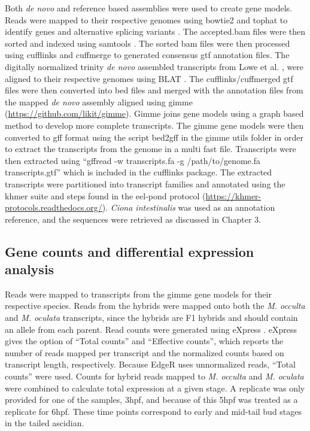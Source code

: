 Both \textit{de novo} and reference based assemblies were used to create gene models. Reads were mapped to their respective genomes using bowtie2 and tophat to identify genes and alternative splicing variants \cite{langmead_fast_2012,trapnell_differential_2012}. The accepted.bam files were then sorted and indexed using samtools \cite{li_sequence_2009}. The sorted bam files were then processed using cufflinks and cuffmerge to generated consensus gtf annotation files. The digitally normalized trinity \textit{de novo} assembled transcripts from Lowe et al. \cite{lowe_evaluating_2014}, were aligned to their respective genomes using BLAT \cite{haas_novo_2013}. The cufflinks/cuffmerged gtf files were then converted into bed files and merged with the annotation files from the mapped \textit{de novo} assembly aligned using gimme (\url{https://github.com/likit/gimme}). Gimme joins gene models using a graph based method to develop more complete transcripts. The gimme gene models were then converted to gff format using the script bed2gff in the gimme utils folder in order to extract the transcripts from the genome in a multi fast file. Transcripts were then extracted using ``gffread -w transcripts.fa -g /path/to/genome.fa transcripts.gtf'' which is included in the cufflinks package. The extracted transcripts were partitioned into transcript families and annotated using the khmer suite and steps found in the eel-pond protocol (\url{https://khmer-protocols.readthedocs.org/}). \textit{Ciona intestinalis} was used as an annotation reference, and the sequences were retrieved as discussed in Chapter 3. 

\subsection{Gene counts and differential expression analysis}
Reads were mapped to transcripts from the gimme gene models for their respective species. Reads from the hybrids were mapped onto both the \textit{M. occulta} and \textit{M. oculata} transcripts, since the hybrids are F1 hybrids and should contain an allele from each parent. Read counts were generated using eXpress \cite{roberts_streaming_2013}. eXpress gives the option of ``Total counts'' and ``Effective counts'', which reports the number of reads mapped per transcript and the normalized counts based on transcript length, respectively. Because EdgeR uses unnormalized reads, ``Total counts'' were used. Counts for hybrid reads mapped to \textit{M. occulta} and \textit{M. oculata} were combined to calculate total expression at a given stage. A replicate was only provided for one of the samples, 3hpf, and because of this 5hpf was treated as a replicate for 6hpf. These time points correspond to early and mid-tail bud stages in the tailed ascidian. 

